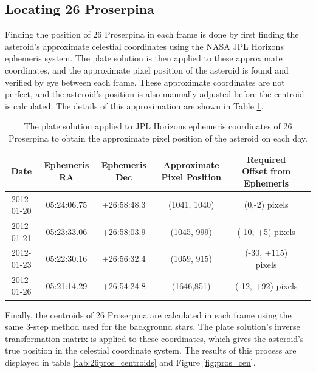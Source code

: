 \documentclass{article}
\begin{document}
\subsection{Locating 26 Proserpina}
Finding the position of 26 Proserpina in each frame is done by first finding the asteroid's approximate celestial coordinates using the NASA JPL Horizons ephemeris system. The plate solution is then 
applied to these approximate coordinates, and the approximate pixel position of the asteroid is found and verified by eye between each frame. These approximate coordinates are not perfect, and the asteroid's 
position is also manually adjusted before the centroid is calculated. The details of this approximation are shown in Table \ref{tab:26pros}. 

\begin{table}[H]
    \centering
    \begin{tabular}{|c|c|c|c|c|c|}
        \hline
        Date & Ephemeris RA & Ephemeris Dec & Approximate Pixel Position & Required Offset from Ephemeris\\
        \hline
        2012-01-20 & 05:24:06.75  &  +26:58:48.3 & (1041, 1040) &  (0,-2) pixels\\
        2012-01-21 & 05:23:33.06 &  +26:58:03.9 & (1045, 999) &  (-10, +5) pixels\\
        2012-01-23 & 05:22:30.16 &  +26:56:32.4 & (1059, 915) &  (-30, +115) pixels\\
        2012-01-26 & 05:21:14.29 &  +26:54:24.8 & (1646,851) &  (-12, +92) pixels\\
        \hline
    \end{tabular}
    \caption{The plate solution applied to JPL Horizons ephemeris coordinates of 26 Proserpina to obtain the approximate pixel position of the asteroid on each
    day.}
    \label{tab:26pros}
\end{table}

Finally, the centroids of 26 Proserpina are calculated in each frame using the same 3-step method used for the background stars. The plate solution's inverse transformation matrix is applied to these coordinates, which gives the asteroid's true position 
in the celestial coordinate system. The results of this process are displayed in table \ref{tab:26pros_centroids} and Figure \ref{fig:pros_cen}.
\end{document}
